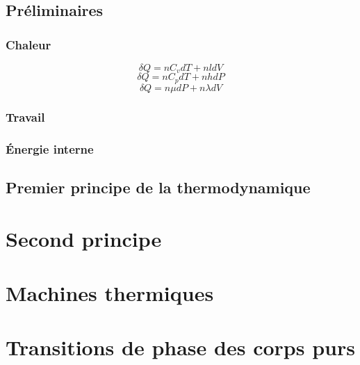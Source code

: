 \section{Préliminaires}
\subsection{Chaleur}
$$\delta Q = nC_vdT+nldV$$
$$\delta Q = nC_pdT+nhdP$$
$$\delta Q = n\mu dP+n\lambda dV$$
\subsection{Travail}
\subsection{Énergie interne}
\section{Premier principe de la thermodynamique}
\chapter{Second principe}
\chapter{Machines thermiques}
\chapter{Transitions de phase des corps purs}
